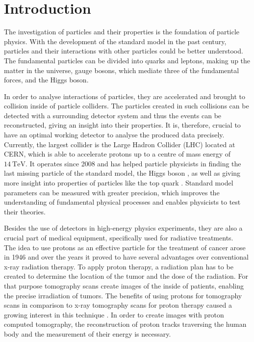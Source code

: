 \chapter{Introduction}
The investigation of particles and their properties is the foundation of particle physics. With the development of the standard model in the past century, particles
and their interactions with other particles could be better understood. The fundamental particles can be divided into quarks and leptons, making up the matter in the universe,
gauge bosons, which mediate three of the fundamental forces, and the Higgs boson.

In order to analyse interactions of particles, they are accelerated and brought to collision inside of particle colliders. The particles created in such collisions
can be detected with a surrounding detector system and thus the events can be reconstructed, giving an insight into their properties. It is, therefore, crucial to have
an optimal working detector to analyse the produced data precisely.
Currently, the largest collider is
the Large Hadron Collider (LHC) \cite{lhc} located at CERN, which is able to accelerate protons up to
a centre of mass energy of $\SI{14}{\tera\eV}$.
It operates since 2008 and has helped particle physicists in finding the last missing particle of the standard model, the Higgs boson \cite{higgs}\cite{higgs_cms}, as well as giving more insight
into properties of particles like the top quark \cite{top}. Standard model parameters can be measured with greater precision, which improves the understanding of fundamental physical processes
and enables physicists to test their theories. %

Besides the use of detectors in high-energy physics experiments, they are also a crucial part of medical equipment, specifically used for radiative treatments. \\
The idea to use protons as an effective particle for the treatment of cancer arose in 1946 \cite{1946} and over the years it proved to have several advantages over
conventional x-ray radiation therapy. To apply proton therapy, a radiation plan has to be created to determine the location of the tumor and the dose of the radiation.
For that purpose tomography scans create images of the inside of patients, enabling the precise irradiation of tumors.
The benefits of using protons for tomography scans in comparison to x-ray tomography scans for proton therapy caused a growing interest in this technique \cite{pbt}.
In order to create images with proton computed tomography, the reconstruction of proton tracks traversing the human body and the measurement of their energy is necessary.

